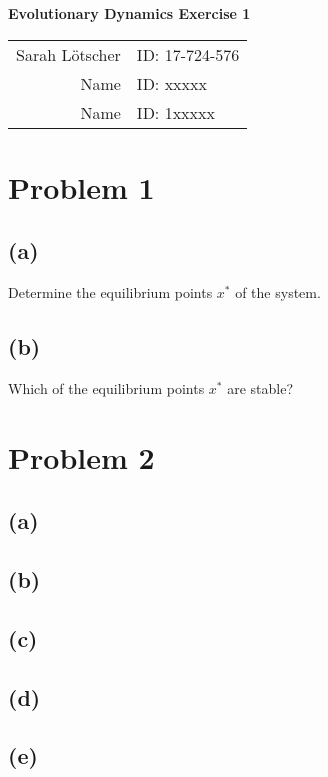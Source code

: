 \documentclass[12pt, a4paper]{article}
\begin{document}
\begin{center}
	\Large \textbf{Evolutionary Dynamics Exercise 1} \\ \vspace{3pt}
	\normalsize \begin{tabular}{rl}
        Sarah Lötscher & ID: 17-724-576 \\
        Name & ID: xxxxx \\
        Name & ID: 1xxxxx
    \end{tabular}
\end{center}


\section*{Problem 1}
\subsection*{(a)} Determine the equilibrium points $x^\ast$ of the system.


\subsection*{(b)} Which of the equilibrium points $x^\ast$ are stable?



\newpage
\section*{Problem 2}
\subsection*{(a)} 




\subsection*{(b)} 


\subsection*{(c)}

\subsection*{(d)}

\newpage
\subsection*{(e)}
\end{document}
